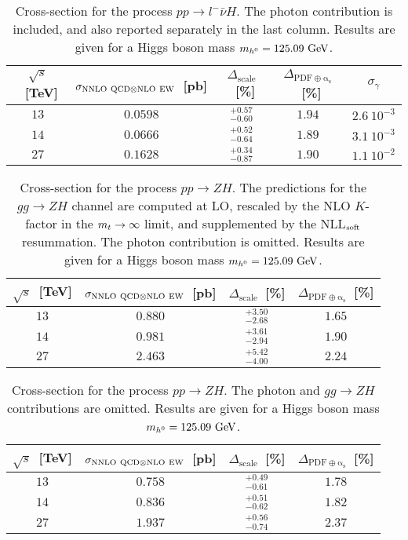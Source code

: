  \begin{table}
\centering
\begin{tabular}{cccc|c}%
\toprule
$\sqrt{s}$~[TeV] & $\sigma_{{\rm NNLO~QCD}\otimes{\rm NLO~EW}}$~[pb] & $\Delta_{\mathrm{scale}}$~[\%] &
$\Delta_{\mathrm{PDF\oplus\alpha_s}}$~[\%] & $\sigma_\gamma$\\
\midrule
$13$ & $0.0598$ & $^{+0.57}_{-0.60}$ & $1.94$ & $2.6~10^{-3}$ \\
$14$ & $0.0666$ & $^{+0.52}_{-0.64}$ & $1.89$ & $3.1~10^{-3}$ \\
$27$ & $0.1628$ & $^{+0.34}_{-0.87}$ & $1.90$ & $1.1~10^{-2}$\\
\bottomrule
\end{tabular}%
\caption{Cross-section for the process $p p \to l^-\bar\nu H$. 
The photon contribution is included, and also reported separately in the last column. 
Results are given for a Higgs boson mass $m_{h^0} = 125.09~{\rm GeV}$.}
\label{tab:l-nuh_xsec}
\end{table}

\begin{table}
\centering
\begin{tabular}{cccc}%
\toprule
$\sqrt{s}$~[TeV] & $\sigma_{{\rm NNLO~QCD}\otimes{\rm NLO~EW}}$~[pb] & $\Delta_{\mathrm{scale}}$~[\%] &
$\Delta_{\mathrm{PDF\oplus\alpha_s}}$~[\%] \\
\midrule
$13$ & $0.880$ & $^{+3.50}_{-2.68}$ & $1.65$ \\
$14$ & $0.981$ & $^{+3.61}_{-2.94}$ & $1.90$ \\
$27$ & $2.463$ & $^{+5.42}_{-4.00}$ & $2.24$ \\
\bottomrule
\end{tabular}%
\caption{Cross-section for the process $p p \to ZH$. The predictions for the $gg\to ZH$ channel are computed 
at LO, rescaled by the NLO $K$-factor in the $m_t \to \infty$ limit,
and supplemented by the NLL$_{\rm soft}$ resummation. The photon contribution is
omitted.  Results are given for a Higgs boson mass $m_{h^0} = 125.09~{\rm GeV}$.}
\label{tab:ZH_xsec}
\end{table}

\begin{table}
\centering
\begin{tabular}{cccc}%
\toprule
$\sqrt{s}$~[TeV] & $\sigma_{{\rm NNLO~QCD}\otimes{\rm NLO~EW}}$~[pb] & $\Delta_{\mathrm{scale}}$~[\%] &
$\Delta_{\mathrm{PDF\oplus\alpha_s}}$~[\%] \\
\midrule
$13$ & $0.758$ & $^{+0.49}_{-0.61}$ & $1.78$ \\
$14$ & $0.836$ & $^{+0.51}_{-0.62}$ & $1.82$ \\
$27$ & $1.937$ & $^{+0.56}_{-0.74}$ & $2.37$ \\
\bottomrule
\end{tabular}%
\caption{Cross-section for the process $p p \to ZH$. The photon 
and $gg\to ZH$ contributions are omitted. Results are given for a Higgs boson mass $m_{h^0} = 125.09~{\rm GeV}$.}
\label{tab:ZHnogg_xsec}
\end{table}

